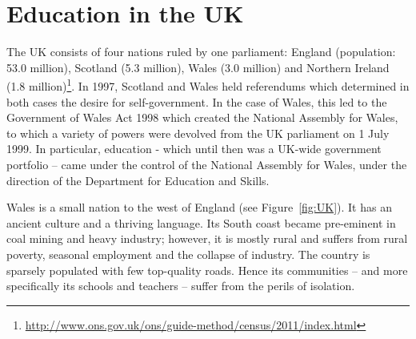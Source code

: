 \documentclass{sig-alternate}
\begin{document}
\section{Education in the UK}\label{sec:schools}

The UK consists of four nations ruled by one parliament:
England (population: 53.0 million), Scotland (5.3 million),
Wales (3.0 million) and Northern Ireland (1.8
million)\footnote{\url{http://www.ons.gov.uk/ons/guide-method/census/2011/index.html}}.
In 1997, Scotland and Wales held referendums which
determined in both cases the desire for self-government.
In the case of Wales, this led to the Government of Wales Act 1998
which created the National Assembly for Wales, to which
a variety of powers were devolved from the UK parliament
on 1 July 1999.
In particular,
education - which until then was a UK-wide government portfolio --
came under the control of the National Assembly for Wales,
under the direction of the Department for Education and Skills.


Wales is a small nation to the west of England (see Figure~\ref{fig:UK}).
It has an ancient culture and a thriving language.
Its South coast became pre-eminent in coal mining and heavy industry;
however, it is mostly rural and suffers from rural poverty,
seasonal employment and the collapse of industry.
The country is sparsely populated with few top-quality roads.
Hence its communities
-- and more specifically its schools and teachers --
suffer from the perils of isolation.
\end{document}
